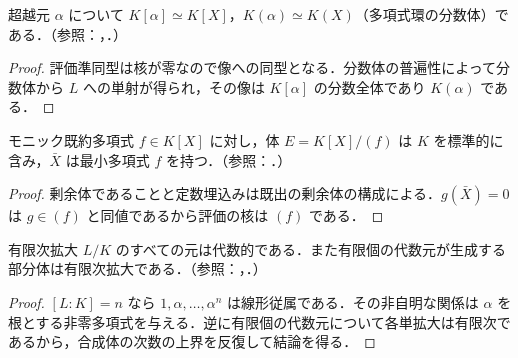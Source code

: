 \begin{prop}[超越的単拡大の構造]
超越元 $\alpha$ について $K[\alpha]\simeq K[X]$，$K(\alpha)\simeq K(X)$（多項式環の分数体）である．（参照：，．）
\end{prop}
\begin{proof}
評価準同型は核が零なので像への同型となる．分数体の普遍性によって分数体から $L$ への単射が得られ，その像は $K[\alpha]$ の分数全体であり $K(\alpha)$ である．
\end{proof}
\begin{prop}[既約多項式の根を持つ拡大の構成]
モニック既約多項式 $f\in K[X]$ に対し，体 $E=K[X]/(f)$ は $K$ を標準的に含み，$\bar X$ は最小多項式 $f$ を持つ．（参照：．）
\end{prop}
\begin{proof}
剰余体であることと定数埋込みは既出の剰余体の構成による．$g(\bar X)=0$ は $g\in(f)$ と同値であるから評価の核は $(f)$ である．
\end{proof}
\begin{prop}[有限次拡大と代数性]
有限次拡大 $L/K$ のすべての元は代数的である．また有限個の代数元が生成する部分体は有限次拡大である．（参照：，．）
\end{prop}
\begin{proof}
$[L:K]=n$ なら $1,\alpha,\ldots,\alpha^n$ は線形従属である．その非自明な関係は $\alpha$ を根とする非零多項式を与える．逆に有限個の代数元について各単拡大は有限次であるから，合成体の次数の上界を反復して結論を得る．
\end{proof}
